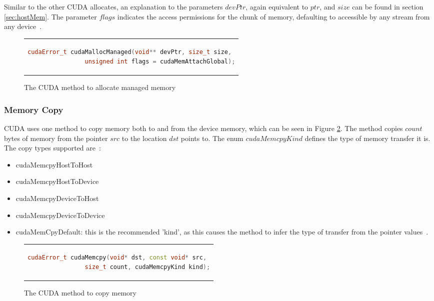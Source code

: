  Similar to the other CUDA allocates, an explanation to the parameters $devPtr$, again equivalent to $ptr$, and $size$ can be found in section \ref{sec:hostMem}. The parameter $flags$ indicates the access permissions for the chunk of memory, defaulting to accessible by any stream from any device~\cite{nvidia_cuda_2022-1}.
  
  \begin{figure}[htpb]
 	\centering
 	\begin{tabular}{c}
 		\begin{lstlisting}[language=C++]
 			cudaError_t cudaMallocManaged(void** devPtr, size_t size, 
 				unsigned int flags = cudaMemAttachGlobal);
 		\end{lstlisting}
 	\end{tabular}
 	\caption[CUDA managed memory allocation]{The CUDA method to allocate managed memory~\cite{nvidia_cuda_2022-1}}
 	\label{fig:mallocmanaged}
 \end{figure}
 
 
 \subsubsection{Memory Copy}
 
 CUDA uses one method to copy memory both to and from the device memory, which can be seen in Figure \ref{fig:cudamemcpy}. The method copies $count$ bytes of memory from the pointer $src$ to the location $dst$ points to. The enum $cudaMemcpyKind$ defines the type of memory transfer it is. The copy types supported are~\cite{nvidia_cuda_2022-1}:
 
 \begin{itemize}
 	\item cudaMemcpyHostToHost
 	\item cudaMemcpyHostToDevice
 	\item cudaMemcpyDeviceToHost
 	\item cudaMemcpyDeviceToDevice
 	\item cudaMemCpyDefault: this is the recommended 'kind', as this causes the method to infer the type of transfer from the pointer values~\cite{nvidia_cuda_2022-1}.
 \end{itemize}
 
  \begin{figure}[htpb]
 	\centering
 	\begin{tabular}{c}
 		\begin{lstlisting}[language=C++]
 			cudaError_t cudaMemcpy(void* dst, const void* src, 
 				size_t count, cudaMemcpyKind kind);
 		\end{lstlisting}
 	\end{tabular}
 	\caption[CUDA memory copy]{The CUDA method to copy memory~\cite{nvidia_cuda_2022-1}}
 	\label{fig:cudamemcpy}
 \end{figure}
 
